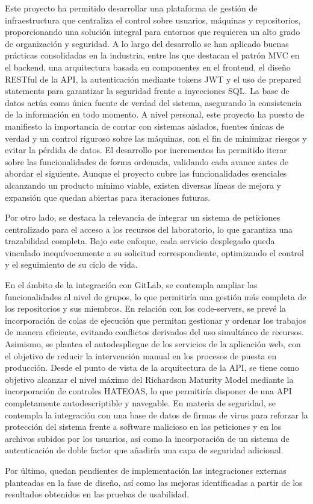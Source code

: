 Este proyecto ha permitido desarrollar una plataforma de gestión de infraestructura que centraliza el control sobre usuarios, máquinas y repositorios, proporcionando una solución integral para entornos que requieren un alto grado de organización y seguridad. A lo largo del desarrollo se han aplicado buenas prácticas consolidadas en la industria, entre las que destacan el patrón MVC en el backend, una arquitectura basada en componentes en el frontend, el diseño RESTful de la API, la autenticación mediante tokens JWT y el uso de prepared statements para garantizar la seguridad frente a inyecciones SQL. La base de datos actúa como única fuente de verdad del sistema, asegurando la consistencia de la información en todo momento.
A nivel personal, este proyecto ha puesto de manifiesto la importancia de contar con sistemas aislados, fuentes únicas de verdad y un control riguroso sobre las máquinas, con el fin de minimizar riesgos y evitar la pérdida de datos. El desarrollo por incrementos ha permitido iterar sobre las funcionalidades de forma ordenada, validando cada avance antes de abordar el siguiente. Aunque el proyecto cubre las funcionalidades esenciales alcanzando un producto mínimo viable, existen diversas líneas de mejora y expansión que quedan abiertas para iteraciones futuras.

Por otro lado, se destaca la relevancia de integrar un sistema de peticiones centralizado para el acceso a los recursos del laboratorio, lo que garantiza una trazabilidad completa. Bajo este enfoque, cada servicio desplegado queda vinculado inequívocamente a su solicitud correspondiente, optimizando el control y el seguimiento de su ciclo de vida.


En el ámbito de la integración con GitLab, se contempla ampliar las funcionalidades al nivel de grupos, lo que permitiría una gestión más completa de los repositorios y sus miembros. En relación con los code-servers, se prevé la incorporación de colas de ejecución que permitan gestionar y ordenar los trabajos de manera eficiente, evitando conflictos derivados del uso simultáneo de recursos. Asimismo, se plantea el autodespliegue de los servicios de la aplicación web, con el objetivo de reducir la intervención manual en los procesos de puesta en producción.
Desde el punto de vista de la arquitectura de la API, se tiene como objetivo alcanzar el nivel máximo del Richardson Maturity Model mediante la incorporación de controles HATEOAS, lo que permitiría disponer de una API completamente autodescriptible y navegable. En materia de seguridad, se contempla la integración con una base de datos de firmas de virus para reforzar la protección del sistema frente a software malicioso en las peticiones y en los archivos subidos por los usuarios, así como la incorporación de un sistema de autenticación de doble factor que añadiría una capa de seguridad adicional.

Por último, quedan pendientes de implementación las integraciones externas planteadas en la fase de diseño, así como las mejoras identificadas a partir de los resultados obtenidos en las pruebas de usabilidad.
